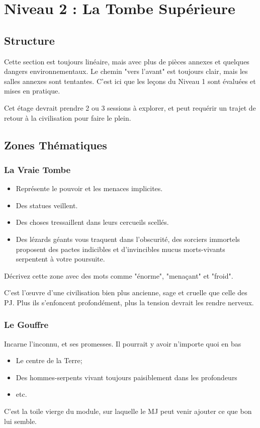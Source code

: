 \chapter{Niveau 2 : La Tombe Supérieure}\label{n2}
\section{Structure}
Cette section est toujours linéaire, mais avec plus de pièces annexes et quelques dangers environnementaux.
Le chemin "vers l'avant" est toujours clair, mais les salles annexes sont tentantes.
C'est ici que les leçons du Niveau 1 sont évaluées et mises en pratique.

Cet étage devrait prendre 2 ou 3 sessions à explorer, et peut requérir un trajet de retour à la civilisation pour faire le plein.


\section{Zones Thématiques}
\subsection{La Vraie Tombe}
\begin{itemize}
  \item Représente le pouvoir et les menaces implicites.
  \item Des statues veillent.
  \item Des choses tressaillent dans leurs cercueils scellés.
  \item Des lézards géants vous traquent dans l'obscurité, des sorciers immortels proposent des pactes indicibles et d'invincibles mucus morts-vivants serpentent à votre poursuite.
\end{itemize}

Décrivez cette zone avec des mots comme "énorme", "menaçant" et "froid".

C'est l'\oe uvre d'une civilisation bien plus ancienne, sage et cruelle que celle des PJ.
Plus ils s'enfoncent profondément, plus la tension devrait les rendre nerveux.
\vfill
\subsection{Le Gouffre}
Incarne l'inconnu, et ses promesses.
Il pourrait y avoir n'importe quoi en bas
\begin{itemize}
  \item Le centre de la Terre;
  \item Des hommes-serpents vivant toujours paisiblement dans les profondeurs
  \item etc.
\end{itemize}
C'est la toile vierge du module, sur laquelle le MJ peut venir ajouter ce que bon lui semble.


